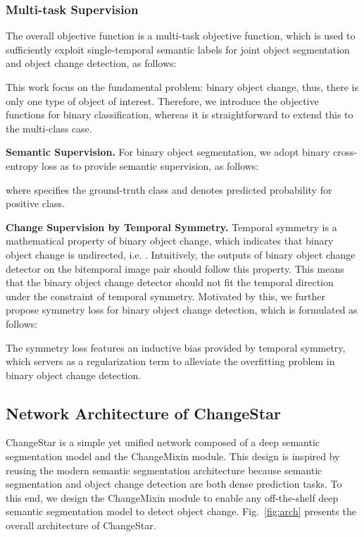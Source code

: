\documentclass[10pt,twocolumn,letterpaper]{article}
\begin{document}
\subsubsection{Multi-task Supervision}
The overall objective function  is a multi-task objective function, which is used to sufficiently exploit single-temporal semantic labels for joint object segmentation and object change detection, as follows:

This work focus on the fundamental problem: binary object change, thus, there is only one type of object of interest.
Therefore, we introduce the objective functions for binary classification, whereas it is straightforward to extend this to the multi-class case.



\noindent \textbf{Semantic Supervision.}
For binary object segmentation, we adopt binary cross-entropy loss  as  to provide semantic supervision, as follows:

where  specifies the ground-truth class and  denotes predicted probability for positive class.

\noindent \textbf{Change Supervision by Temporal Symmetry.}
Temporal symmetry is a mathematical property of binary object change, which indicates that binary object change is undirected, i.e. .
Intuitively, the outputs of binary object change detector on the bitemporal image pair should follow this property.
This means that the binary object change detector should not fit the temporal direction under the constraint of temporal symmetry.
Motivated by this, we further propose symmetry loss for binary object change detection, which is formulated as follows:

The symmetry loss features an inductive bias provided by temporal symmetry, which servers as a regularization term to alleviate the overfitting problem in binary object change detection.


\subsection{Network Architecture of ChangeStar}
ChangeStar is a simple yet unified network composed of a deep semantic segmentation model and the ChangeMixin module.
This design is inspired by reusing the modern semantic segmentation architecture because semantic segmentation and object change detection are both dense prediction tasks.
To this end, we design the ChangeMixin module to enable any off-the-shelf deep semantic segmentation model to detect object change.
Fig.~\ref{fig:arch} presents the overall architecture of ChangeStar.
\end{document}
